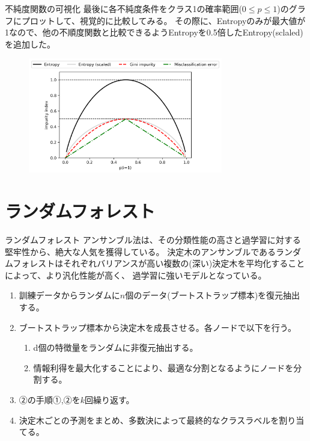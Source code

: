 \documentclass[aspectratio=169, dvipdfmx, 11pt]{beamer} %
\begin{document}
\begin{frame}{不純度関数の可視化}
    最後に各不純度条件をクラス1の確率範囲(\(0\leq p \leq 1\))のグラフにプロットして、視覚的に比較してみる。
    その際に、Entropyのみが最大値が1なので、他の不順度関数と比較できるようEntropyを0.5倍したEntropy(sclaled)を追加した。
    \vspace{1em}
    \begin{figure}[b]
        \begin{center}
        \includegraphics[width=85mm]{img/day03/fig03.png}
        \end{center}
    \end{figure}
\end{frame}

\section{ランダムフォレスト}
\begin{frame}{ランダムフォレスト}
    アンサンブル法は、その分類性能の高さと過学習に対する堅牢性から、絶大な人気を獲得している。
    決定木のアンサンブルであるランダムフォレストはそれぞれバリアンスが高い複数の(深い)決定木を平均化することによって、より汎化性能が高く、
    過学習に強いモデルとなっている。
    \vspace{1em}
    \begin{enumerate}
        \item 訓練データからランダムに\(n\)個のデータ(ブートストラップ標本)を復元抽出する。
        \item ブートストラップ標本から決定木を成長させる。各ノードで以下を行う。
        \begin{enumerate}
            \item d個の特徴量をランダムに非復元抽出する。
            \item 情報利得を最大化することにより、最適な分割となるようにノードを分割する。
        \end{enumerate}
        \item ②の手順①,②を\(k\)回繰り返す。
        \item 決定木ごとの予測をまとめ、多数決によって最終的なクラスラベルを割り当てる。
    \end{enumerate}
    \vspace{1em}
\end{frame}
\end{document}
